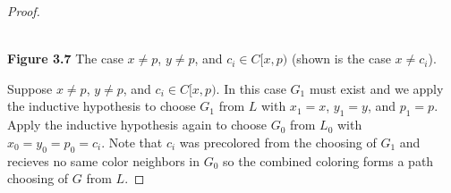 \documentclass[11pt,letter]{article}
\begin{document}
\begin{proof}
\begin{center}
\hfill\\
\textbf{Figure 3.7} The case $x\ne p$, $y\ne p$, and $c_i\in C[x,p)$ (shown is the case $x\ne c_i$).
\end{center}

\noindent Suppose $x\ne p$, $y\ne p$, and $c_i\in C[x,p)$. In this case $G_1$ must exist and we apply
the inductive hypothesis to choose $G_1$ from $L$ with $x_1=x$, $y_1=y$, and $p_1=p$.
Apply the inductive hypothesis again to choose $G_0$ from
$L_0$ with $x_0=y_0=p_0=c_i$. Note that $c_i$ was precolored from the choosing of $G_1$ and recieves
no same color neighbors in $G_0$ so the combined coloring forms a path choosing of $G$ from $L$.


\end{proof}
\end{document}
